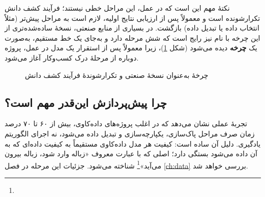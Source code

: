نکتهٔ مهم این است که در عمل، این مراحل خطی نیستند؛ فرآیند کشف دانش تکرارشونده است و
معمولاً پس از ارزیابی نتایج اولیه، لازم است به مراحل پیش‌تر (مثلاً انتخاب داده
یا تبدیل داده) بازگشت. در بسیاری از منابع صنعتی، نسخهٔ ساده‌شده‌تری از این
چرخه با نام 
نیز رایج است که شش مرحله دارد و به‌جای یک خط مستقیم، به‌صورت یک \textbf{چرخه}
دیده می‌شود (شکل \ref{fig:crispdm-cycle})، زیرا معمولاً پس از استقرار یک مدل در
عمل، پروژه دوباره از مرحلهٔ درک کسب‌وکار آغاز می‌شود.

\begin{figure}[htbp]
\centering
{}
\caption{چرخهٔ  به‌عنوان نسخهٔ صنعتی و تکرارشوندهٔ فرآیند کشف دانش}
\label{fig:crispdm-cycle}
\end{figure}

\subsection{چرا پیش‌پردازش این‌قدر مهم است؟}

تجربهٔ عملی نشان می‌دهد که در اغلب پروژه‌های داده‌کاوی، بیش از ۶۰ تا ۷۰ درصد
زمان صرف مراحل پاک‌سازی، یکپارچه‌سازی و تبدیل داده می‌شود، نه اجرای الگوریتم
یادگیری. دلیل آن ساده است: کیفیت هر مدل داده‌کاوی مستقیماً به کیفیت داده‌ای
که به آن داده می‌شود بستگی دارد؛ اصلی که با عبارت معروف «زباله وارد شود،
زباله بیرون می‌آید»\footnote{} شناخته می‌شود. جزئیات
این مرحله در فصل \ref{ch:data} بررسی خواهد شد.


